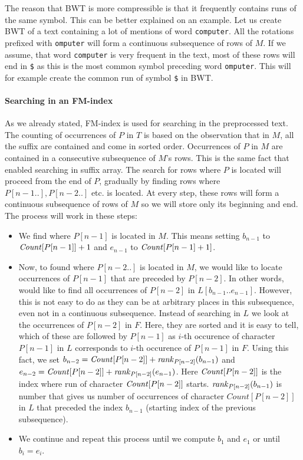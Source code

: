 The reason that BWT is more compressible is that it frequently contains runs of the same
symbol. This can be better explained on an example. Let us create BWT of a text containing
a lot of mentions of word {\tt computer}. All the rotations prefixed with {\tt omputer} will form a
continuous subsequence of rows of $M$. If we assume, that word {\tt computer} is very frequent
in the text, most of these rows will end in {\tt \$} as this is the most common symbol preceding
word {\tt omputer}. This will for example create the common run of symbol {\tt \$} in BWT.

\paragraph{Searching in an FM-index}

As we already stated, FM-index is used for searching in the preprocessed text.
The counting of occurrences of $P$ in $T$ is based on the observation that in $M$,
all the suffix are contained and come in sorted order. Occurrences of $P$ in $M$
are contained in a consecutive subsequence of $M$'s rows. This is the same fact that
enabled searching in suffix array. The search for rows where $P$ is located will proceed
from the end of $P$, gradually by finding rows where $P[n-1..], P[n-2..]$ etc. is located.
At every step, these rows will form a continuous subsequence of rows of $M$ so we will store
only its beginning and end. The process will work in these steps:

\begin{itemize}
	\item We find where $P[n-1]$ is located in $M$. This means setting $b_{n-1}$ to
	$\mathit{Count}[P[n-1]]+1$ and $e_{n-1}$ to $\mathit{Count}[P[n-1]+1]$.
	\item Now, to found where $P[n-2..]$ is located in $M$, we would like to locate occurrences
	of $P[n-1]$ that are preceded by $P[n-2]$. In other words, would like to find all
	occurrences of $P[n-2]$ in $L[b_{n-1}..e_{n-1}]$. However, this is not easy to do
	as they can be at arbitrary places in this subsequence, even not in a continuous
	subsequence. Instead of searching in $L$ we look at the occurrences of $P[n-2]$ in
	$F$. Here, they are sorted and it is easy to tell, which of these are followed by
	$P[n-1]$ as $i$-th occurence of character $P[n-1]$ in $L$ corresponds to $i$-th
	occurence of $P[n-1]$ in $F$. Using this fact, we set
	$b_{n-2} = \mathit{Count}[P[n-2]] + \mathit{rank}_{P[n-2]}(b_{n-1})$ and
	$e_{n-2} = \mathit{Count}[P[n-2]] + \mathit{rank}_{P[n-2]}(e_{n-1})$. Here $\mathit{Count}[P[n-2]]$
	is the index where run of character $\mathit{Count}[P[n-2]]$ starts. $\mathit{rank}_{P[n-2]}(b_{n-1})$
	is number that gives us number of occurrences of character $Count[P[n-2]]$ in $L$ that
	preceded the index $b_{n-1}$ (starting index of the previous subsequence).
	\item We continue and repeat this process until we compute $b_1$ and $e_1$ or until
	$b_i=e_i$.
\end{itemize}

